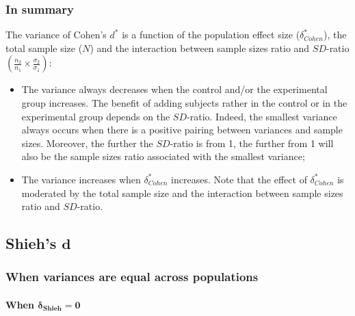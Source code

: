 \documentclass[
  english,
  man,mask]{apa6}
\providecommand{\tightlist}{%
  \setlength{\itemsep}{0pt}\setlength{\parskip}{0pt}}
\let\oldparagraph\paragraph
\renewcommand{\paragraph}[1]{\oldparagraph{#1}\mbox{}}
\begin{document}
\hypertarget{in-summary-2}{%
\subsubsection{In summary}\label{in-summary-2}}

The variance of Cohen's \(d^*\) is a function of the population effect size (\(\delta^*_{Cohen}\)), the total sample size (\(N\)) and the interaction between sample sizes ratio and \(SD\)-ratio \(\left(\frac{n_2}{n_1}\times\frac{\sigma_2}{\sigma_1} \right)\):

\begin{itemize}
\tightlist
\item
  The variance always decreases when the control and/or the experimental group increases. The benefit of adding subjects rather in the control or in the experimental group depends on the \(SD\)-ratio. Indeed, the smallest variance always occurs when there is a positive pairing between variances and sample sizes. Moreover, the further the \(SD\)-ratio is from 1, the further from 1 will also be the sample sizes ratio associated with the smallest variance;\\
\item
  The variance increases when \(\delta^*_{Cohen}\) increases. Note that the effect of \(\delta^*_{Cohen}\) is moderated by the total sample size and the interaction between sample sizes ratio and \(SD\)-ratio.
\end{itemize}

\hypertarget{shiehs-bmd}{%
\subsection{\texorpdfstring{Shieh's \(\bm{d}\)}{Shieh's \textbackslash bm\{d\}}}\label{shiehs-bmd}}

\hypertarget{when-variances-are-equal-across-populations-3}{%
\subsubsection{When variances are equal across populations}\label{when-variances-are-equal-across-populations-3}}

\hypertarget{when-bmdelta_shieh-0}{%
\paragraph{\texorpdfstring{When \(\bm{\delta_{Shieh} = 0}\)}{When \textbackslash bm\{\textbackslash delta\_\{Shieh\} = 0\}}}\label{when-bmdelta_shieh-0}}
\end{document}
